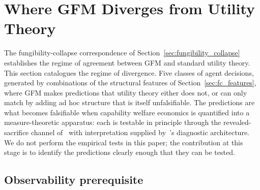 \section{Where GFM Diverges from Utility Theory}
\label{sec:structural_predictions}

The fungibility-collapse correspondence of
Section~\ref{sec:fungibility_collapse} establishes the regime of
agreement between GFM and standard utility theory.  This section
catalogues the regime of divergence.  Five classes of agent
decisions, generated by combinations of the structural features
of Section~\ref{sec:fc_features}, where GFM makes predictions
that utility theory either does not, or can only match by adding
ad hoc structure that is itself unfalsifiable.  The predictions
are what becomes falsifiable when capability welfare economics is
quantified into a measure-theoretic apparatus: each is testable
in principle through the revealed-sacrifice channel
of~\citep[Revealed~Sacrifice]{lasser2026paper8a} with
interpretation supplied by~\citep[Need~Sufficiency]{lasser2026paper8b}'s
diagnostic architecture.  We do not perform the empirical tests
in this paper; the contribution at this stage is to identify the
predictions clearly enough that they can be tested.

\subsection{Observability prerequisite}
\label{sec:observability_prereq}

